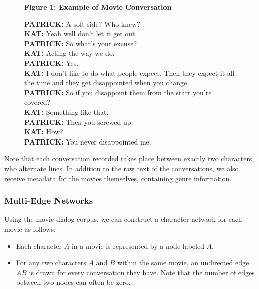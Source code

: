 \documentclass{article} %
\begin{document}
\begin{figure}[ht]
    \centering
    \textbf{Figure 1: Example of Movie Conversation}\\[1em] %
        \begin{minipage}{0.9\textwidth}
            \textbf{PATRICK:} A soft side? Who knew?\\
            \textbf{KAT:} Yeah well don’t let it get out.\\
            \textbf{PATRICK:} So what’s your excuse?\\
            \textbf{KAT:} Acting the way we do.\\
            \textbf{PATRICK:} Yes.\\
            \textbf{KAT:} I don’t like to do what people expect. Then they expect it all the time and they get disappointed when you change.\\
            \textbf{PATRICK:} So if you disappoint them from the start you’re covered?\\
            \textbf{KAT:} Something like that.\\
            \textbf{PATRICK:} Then you screwed up.\\
            \textbf{KAT:} How?\\
            \textbf{PATRICK:} You never disappointed me.
        \end{minipage}
    \label{fig:movie_conversation}
\end{figure}

Note that each conversation recorded takes place between exactly two characters, who alternate lines. In addition to the raw text of the conversations, we also receive metadata for the movies themselves, containing genre information.

\subsubsection{Multi-Edge Networks}

Using the movie dialog corpus, we can construct a character network for each movie as follows:  
\begin{itemize}
\item Each character \( A \) in a movie is represented by a node labeled \( A \).  
\item For any two characters \( A \) and \( B \) within the same movie, an undirected edge \( AB \) is drawn for every conversation they have. Note that the number of edges between two nodes can often be zero.  
\end{itemize}
\end{document}
